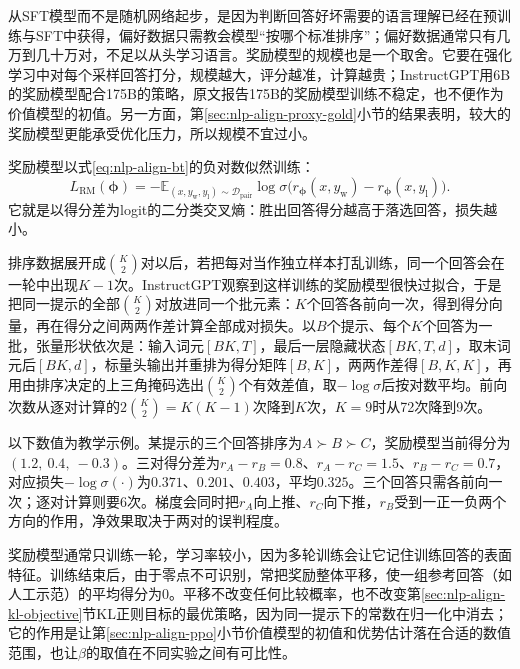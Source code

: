 从SFT模型而不是随机网络起步，是因为判断回答好坏需要的语言理解已经在预训练与SFT中获得，偏好数据只需教会模型“按哪个标准排序”；偏好数据通常只有几万到几十万对，不足以从头学习语言。奖励模型的规模也是一个取舍。它要在强化学习中对每个采样回答打分，规模越大，评分越准，计算越贵；InstructGPT用6B的奖励模型配合175B的策略，原文报告175B的奖励模型训练不稳定，也不便作为价值模型的初值。另一方面，第\ref{sec:nlp-align-proxy-gold}小节的结果表明，较大的奖励模型更能承受优化压力，所以规模不宜过小。

奖励模型以式\eqref{eq:nlp-align-bt}的负对数似然训练：
\begin{equation}
\label{eq:nlp-align-reward-loss}
 L_{\mathrm{RM}}(\bm{\phi})
 =-\mathbb{E}_{(x,y_{\mathrm w},y_{\mathrm l})\sim\mathcal{D}_{\mathrm{pair}}}
 \log\sigma\bigl(r_{\bm{\phi}}(x,y_{\mathrm w})-r_{\bm{\phi}}(x,y_{\mathrm l})\bigr).
\end{equation}
它就是以得分差为logit的二分类交叉熵：胜出回答得分越高于落选回答，损失越小。

排序数据展开成$\binom K2$对以后，若把每对当作独立样本打乱训练，同一个回答会在一轮中出现$K-1$次。InstructGPT观察到这样训练的奖励模型很快过拟合，于是把同一提示的全部$\binom K2$对放进同一个批元素：$K$个回答各前向一次，得到得分向量，再在得分之间两两作差计算全部成对损失。以$B$个提示、每个$K$个回答为一批，张量形状依次是：输入词元$[BK,T]$，最后一层隐藏状态$[BK,T,d]$，取末词元后$[BK,d]$，标量头输出并重排为得分矩阵$[B,K]$，两两作差得$[B,K,K]$，再用由排序决定的上三角掩码选出$\binom K2$个有效差值，取$-\log\sigma$后按对数平均。前向次数从逐对计算的$2\binom K2=K(K-1)$次降到$K$次，$K=9$时从72次降到9次。

\begin{example}[三个回答的批内成对损失]
  \label{ex:nlp-align-rm-batch}
  以下数值为教学示例。某提示的三个回答排序为$A\succ B\succ C$，奖励模型当前得分为$(1.2,\ 0.4,\ -0.3)$。三对得分差为$r_A-r_B=0.8$、$r_A-r_C=1.5$、$r_B-r_C=0.7$，对应损失$-\log\sigma(\cdot)$为$0.371$、$0.201$、$0.403$，平均$0.325$。三个回答只需各前向一次；逐对计算则要6次。梯度会同时把$r_A$向上推、$r_C$向下推，$r_B$受到一正一负两个方向的作用，净效果取决于两对的误判程度。
\end{example}

奖励模型通常只训练一轮，学习率较小，因为多轮训练会让它记住训练回答的表面特征。训练结束后，由于零点不可识别，常把奖励整体平移，使一组参考回答（如人工示范）的平均得分为0。平移不改变任何比较概率，也不改变第\ref{sec:nlp-align-kl-objective}节KL正则目标的最优策略，因为同一提示下的常数在归一化中消去；它的作用是让第\ref{sec:nlp-align-ppo}小节价值模型的初值和优势估计落在合适的数值范围，也让$\beta$的取值在不同实验之间有可比性。

